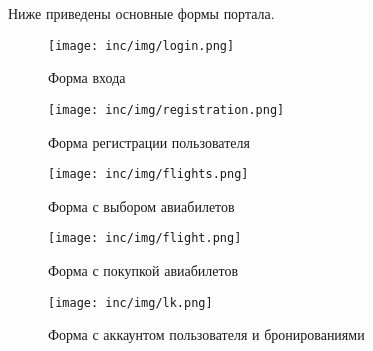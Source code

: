 Ниже приведены основные формы портала. 
\newpage

\begin{figure}[h!]
  \centering
  \texttt{[image: inc/img/login.png]}
  \caption{Форма входа}
  \label{fig:scheme}
\end{figure}

\begin{figure}[h!]
  \centering
  \texttt{[image: inc/img/registration.png]}
  \caption{Форма регистрации пользователя}
  \label{fig:scheme}
\end{figure}

\begin{figure}[h!]
  \centering
  \texttt{[image: inc/img/flights.png]}
  \caption{Форма с выбором авиабилетов}
  \label{fig:scheme}
\end{figure}


\begin{figure}[h!]
  \centering
  \texttt{[image: inc/img/flight.png]}
  \caption{Форма с покупкой авиабилетов}
  \label{fig:scheme}
\end{figure}



\begin{figure}[h!]
  \centering
  \texttt{[image: inc/img/lk.png]}
  \caption{Форма с аккаунтом пользователя и бронированиями}
  \label{fig:scheme}
\end{figure}


